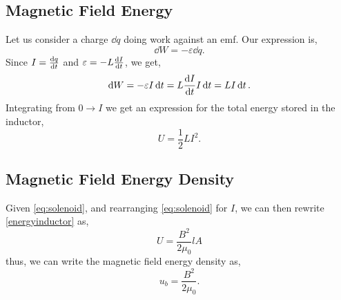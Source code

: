 \documentclass{book}
\begin{document}
\subsection{Magnetic Field Energy}
Let us consider a charge $\dd{q}$ doing work against an emf. Our expression is,
\begin{equation}
	\dd{W} = -\varepsilon \dd{q}.
\end{equation}
Since $I = \dv{q}{t}$ and $\varepsilon = -L\dv{I}{t}$, we get,
\begin{equation}
	\dd{W} = -\varepsilon I\dd{t} = L\dv{I}{t}I\dd{t} = LI\dd{t}.
\end{equation}
Integrating from $0 \to I$ we get an expression for the total energy stored in the inductor,
\begin{equation}
	U = \frac{1}{2}LI^2. \label{energyinductor}
\end{equation}
\subsection{Magnetic Field Energy Density}
Given \eqref{eq:solenoid}, and rearranging \eqref{eq:solenoid} for $I$, we can then rewrite \eqref{energyinductor} as,
\begin{equation}
	U = \frac{B^2}{2\mu_0}lA
\end{equation}
thus, we can write the magnetic field energy density as,
\begin{equation}
	u_b = \frac{B^2}{2\mu_0}.
\end{equation}
\end{document}
